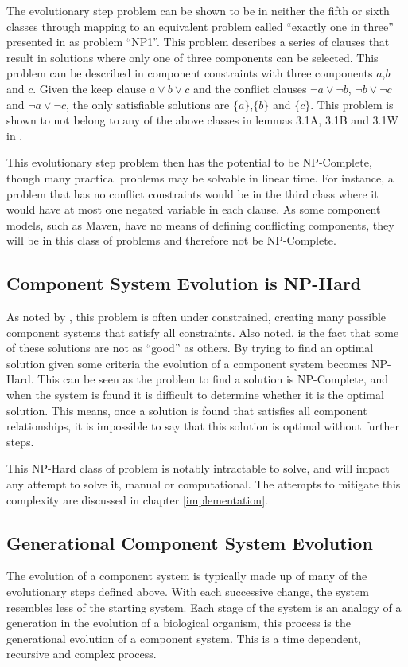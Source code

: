 The evolutionary step problem can be shown to be in neither the fifth or sixth classes 
through mapping to an equivalent problem called ``exactly one in three'' presented in \cite{Schaefer1978} as problem ``NP1''.
This problem describes a series of clauses that result in solutions where only one of three components can be selected. 
This problem can be described in component constraints with three components $a$,$b$ and $c$.
Given the keep clause $a \vee b \vee c$ and the conflict clauses  $\neg a \vee \neg b$, $\neg b \vee \neg c$ and $\neg a \vee \neg c$, 
the only satisfiable solutions are $\{a\}$,$\{b\}$ and $\{c\}$. 
This problem is shown to not belong to any of the above classes in lemmas 3.1A, 3.1B and 3.1W in \cite{Schaefer1978}.

This evolutionary step problem then has the potential to be NP-Complete, though many practical problems may be solvable in linear time.
For instance, a problem that has no conflict constraints would be in the third class where it would have at most one negated variable in each clause.
As some component models, such as Maven, have no means of defining conflicting components, they will be in this class of problems and therefore not be NP-Complete. 

\subsection{Component System Evolution is NP-Hard}
As noted by \cite{Berre2008}, this problem is often under constrained, creating many possible component systems that satisfy all constraints.
Also noted, is the fact that some of these solutions are not as ``good'' as others.
By trying to find an optimal solution given some criteria the evolution of a component system becomes NP-Hard.
This can be seen as the problem to find a solution is NP-Complete, and when the system is found it is difficult to determine whether it is the optimal solution.
This means, once a solution is found that satisfies all component relationships, it is impossible to say that this solution is optimal without further steps. 

This NP-Hard class of problem is notably intractable to solve, and will impact any attempt to solve it, manual or computational.
The attempts to mitigate this complexity are discussed in chapter \ref{implementation}.

\subsection{Generational Component System Evolution}
\label{formal.evo}
The evolution of a component system is typically made up of many of the evolutionary steps defined above. 
With each successive change, the system resembles less of the starting system.
Each stage of the system is an analogy of a generation in the evolution of a biological organism, this process is the generational evolution of a component system.
This is a time dependent, recursive and complex process. 

